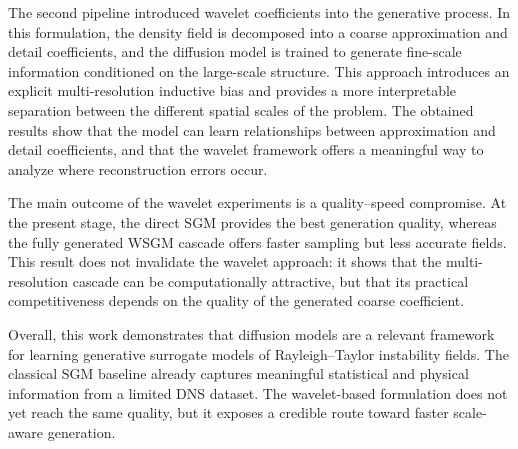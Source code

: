 The second pipeline introduced wavelet coefficients into the generative
process. In this formulation, the density field is decomposed into a coarse
approximation and detail coefficients, and the diffusion model is trained to
generate fine-scale information conditioned on the large-scale structure. This
approach introduces an explicit multi-resolution inductive bias and provides a
more interpretable separation between the different spatial scales of the
problem. The obtained results show that the model can learn relationships
between approximation and detail coefficients, and that the wavelet framework
offers a meaningful way to analyze where reconstruction errors occur.

The main outcome of the wavelet experiments is a quality--speed compromise. At
the present stage, the direct SGM provides the best generation quality, whereas
the fully generated WSGM cascade offers faster sampling but less accurate
fields. This result does not invalidate the wavelet approach: it shows that the
multi-resolution cascade can be computationally attractive, but that its
practical competitiveness depends on the quality of the generated coarse
coefficient.

Overall, this work demonstrates that diffusion models are a relevant framework
for learning generative surrogate models of Rayleigh--Taylor instability
fields. The classical SGM baseline already captures meaningful statistical and
physical information from a limited DNS dataset. The wavelet-based formulation
does not yet reach the same quality, but it exposes a credible route toward
faster scale-aware generation.




% 
